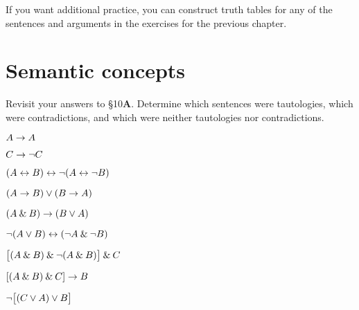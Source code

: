 If you want additional practice, you can construct truth tables for any of the sentences and arguments in the exercises for the previous chapter.



\chapter{Semantic concepts}\setcounter{ProbPart}{0}
\problempart
Revisit your answers to \S10\textbf{A}. Determine which sentences were tautologies, which were contradictions, and which were neither tautologies nor contradictions.
\begin{earg}
\item $A \rightarrow A$ \hfill {}
\item $C \rightarrow\neg C$ \hfill {}
\item $(A \leftrightarrow B) \leftrightarrow \neg(A\leftrightarrow \neg B)$  \hfill {}
\item $(A \rightarrow B) \vee (B \rightarrow A)$  \hfill {}
\item $(A \mathbin{\&} B) \rightarrow (B \vee A)$  \hfill {}
\item $\neg(A \vee B) \leftrightarrow (\neg A \mathbin{\&} \neg B)$ \hfill {}
\item $\bigl[(A\mathbin{\&} B) \mathbin{\&}\neg(A\mathbin{\&} B)\bigr] \mathbin{\&} C$  \hfill {}
\item $[(A \mathbin{\&} B) \mathbin{\&} C] \rightarrow B$  \hfill {}
\item $\neg\bigl[(C\vee A) \vee B\bigr]$  \hfill {}
\end{earg}

\

